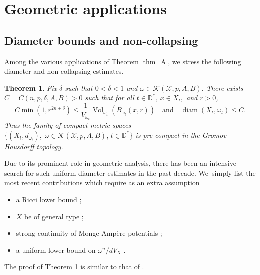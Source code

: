 \documentclass[10pt]{amsart}
\DeclareMathOperator{\diam}{diam}
\DeclareMathOperator{\Vol}{Vol}
\newtheorem{theorem}{Theorem}[section]
\theoremstyle{definition}
\newcommand{\D}{\mathbb D}
\begin{document}
\section{Geometric applications}

\subsection{Diameter bounds and non-collapsing}

Among the various applications of Theorem \ref{thm_A}, we stress the following diameter and non-collapsing estimates.

\begin{theorem} \label{thm:diameter}
Fix $\delta$ such that $0<\delta<1$ and $\omega \in {\mathcal K}(\mathcal{X},p,A,B)$.
There exists $C=C(n,p,\delta,A,B)>0$ such that for all $ t \in \D^*$, $x \in X_t, $ and $r>0$,
\[
C \min(1,r^{2n+\delta}) \leq \frac{1}{V_{\omega_t}} \Vol_{\omega_t}(B_{\omega_t}(x,r))
\quad \text{and} \quad
\diam(X_t,\omega_t) \leq C.
\]
Thus the family of compact metric spaces
$\{ (X_t,d_{\omega_t}), \; \omega \in {\mathcal K}(\mathcal{X},p,A,B), \, t \in \D^* \}$
is pre-compact in the Gromov-Hausdorff topology.
\end{theorem}

Due to its prominent role in geometric analysis, there has been an intensive search for such uniform diameter estimates in the past decade. We~simply list the most recent contributions which require as an extra assumption
\begin{itemize}
\item a Ricci lower bound \cite{LTZ17,FGS20,GS22};
\item $X$ be of general type \cite{Bam18,Wang18,JS22};
\item strong continuity of Monge-Ampère potentials \cite{Li21,GGZ23,V23};
\item a uniform lower bound on $\omega^n/dV_X$ \cite{GPS22,GPSS22,GPSS23}.
\end{itemize}

The proof of Theorem \ref{thm:diameter} is similar to that of \cite[Th.\,1.1]{GPSS22}.
\end{document}
